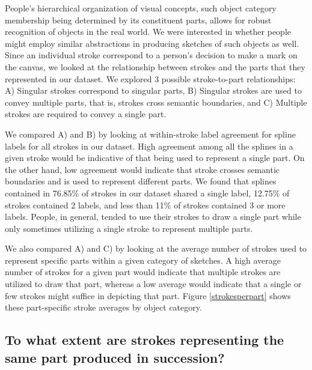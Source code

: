 \documentclass[10pt,letterpaper]{article}
\newcommand{\kushin}[1]{{\color{orange}{[kushin: #1]}}}
\begin{document}
People's hierarchical organization of visual concepts, such object category membership being determined by its constituent parts, allows for robust recognition of objects in the real world. 
We were interested in whether people might employ similar abstractions in producing sketches of such objects as well. 
Since an individual stroke correspond to a person's decision to make a mark on the canvas, we looked at the relationship between strokes and the parts that they represented in our dataset. 
We explored 3 possible stroke-to-part relationships:
A) Singular strokes correspond to singular parts, B) Singular strokes are used to convey multiple parts, that is, strokes cross semantic boundaries, and C) Multiple strokes are required to convey a single part. 

We compared A) and B) by looking at within-stroke label agreement for spline labels for all strokes in our dataset. High agreement among all the splines in a given stroke would be indicative of that being used to represent a single part. 
On the other hand, low agreement would indicate that stroke crosses semantic boundaries and is used to represent different parts. 
We found that splines contained in 76.85\% of strokes in our dataset shared a single label, 12.75\% of strokes contained 2 labels, and less than 11\% of strokes contained 3 or more labels. 
People, in general, tended to use their strokes to draw a single part while only sometimes utilizing a single stroke to represent multiple parts.

We also compared A) and C) by looking at the average number of strokes used to represent specific parts within a given category of sketches. 
A high average number of strokes for a given part would indicate that multiple strokes are utilized to draw that part, whereas a low average would indicate that a single or few strokes might suffice in depicting that part. 
Figure \ref{strokesperpart} shows these part-specific stroke averages by object category.
\kushin{I feel the above summary, including the figure caption for figure 2 is a little inconclusive. Thoughts on how to remedy this?}

\subsection{To what extent are strokes representing the same part produced in succession?}
\end{document}
